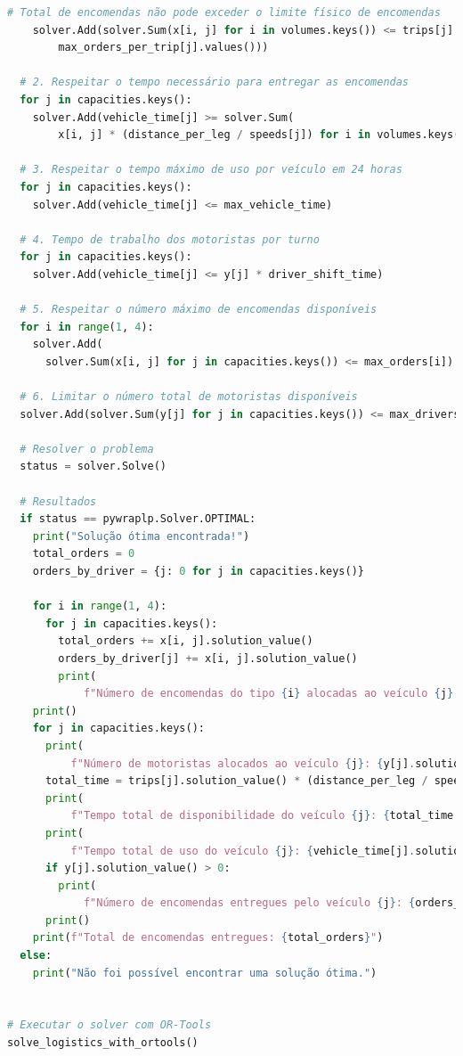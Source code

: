 \documentclass[12pt,a4paper,final]{article}
\begin{document}
\begin{lstlisting}[language=Python, label={lst:codigo}]
    # Total de encomendas não pode exceder o limite físico de encomendas
    solver.Add(solver.Sum(x[i, j] for i in volumes.keys()) <= trips[j] * sum(
        max_orders_per_trip[j].values()))

  # 2. Respeitar o tempo necessário para entregar as encomendas
  for j in capacities.keys():
    solver.Add(vehicle_time[j] >= solver.Sum(
        x[i, j] * (distance_per_leg / speeds[j]) for i in volumes.keys()))

  # 3. Respeitar o tempo máximo de uso por veículo em 24 horas
  for j in capacities.keys():
    solver.Add(vehicle_time[j] <= max_vehicle_time)

  # 4. Tempo de trabalho dos motoristas por turno
  for j in capacities.keys():
    solver.Add(vehicle_time[j] <= y[j] * driver_shift_time)

  # 5. Respeitar o número máximo de encomendas disponíveis
  for i in range(1, 4):
    solver.Add(
      solver.Sum(x[i, j] for j in capacities.keys()) <= max_orders[i])

  # 6. Limitar o número total de motoristas disponíveis
  solver.Add(solver.Sum(y[j] for j in capacities.keys()) <= max_drivers)

  # Resolver o problema
  status = solver.Solve()

  # Resultados
  if status == pywraplp.Solver.OPTIMAL:
    print("Solução ótima encontrada!")
    total_orders = 0
    orders_by_driver = {j: 0 for j in capacities.keys()}

    for i in range(1, 4):
      for j in capacities.keys():
        total_orders += x[i, j].solution_value()
        orders_by_driver[j] += x[i, j].solution_value()
        print(
            f"Número de encomendas do tipo {i} alocadas ao veículo {j}: {x[i, j].solution_value()}")
    print()
    for j in capacities.keys():
      print(
          f"Número de motoristas alocados ao veículo {j}: {y[j].solution_value():.0f}")
      total_time = trips[j].solution_value() * (distance_per_leg / speeds[j])
      print(
          f"Tempo total de disponibilidade do veículo {j}: {total_time:.0f} horas")
      print(
          f"Tempo total de uso do veículo {j}: {vehicle_time[j].solution_value():.0f} horas")
      if y[j].solution_value() > 0:
        print(
            f"Número de encomendas entregues pelo veículo {j}: {orders_by_driver[j]:.0f}")
      print()
    print(f"Total de encomendas entregues: {total_orders}")
  else:
    print("Não foi possível encontrar uma solução ótima.")


# Executar o solver com OR-Tools
solve_logistics_with_ortools()


\end{lstlisting}
\end{document}
